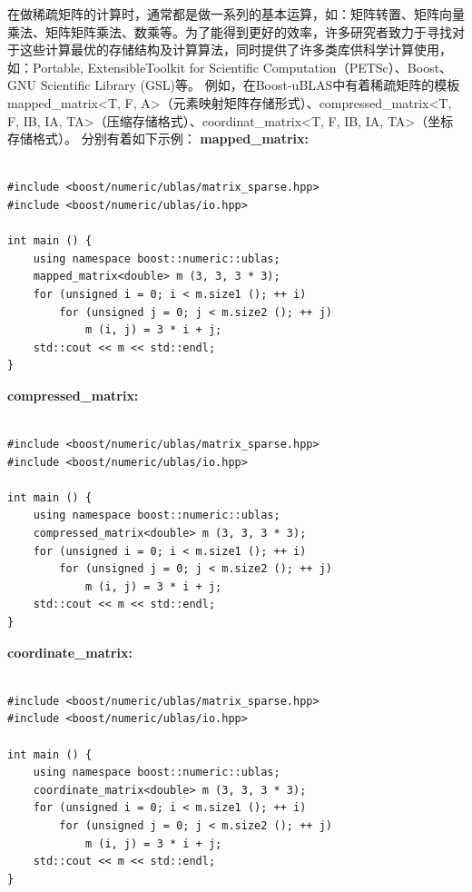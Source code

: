 在做稀疏矩阵的计算时，通常都是做一系列的基本运算，如：矩阵转置、矩阵向量乘法、矩阵矩阵乘法、数乘等。为了能得到更好的效率，许多研究者致力于寻找对于这些计算最优的存储结构及计算算法，同时提供了许多类库供科学计算使用，如：Portable, ExtensibleToolkit for Scientific Computation（PETSc）、Boost、GNU Scientific Library (GSL)等。\newline
例如，在Boost-uBLAS中有着稀疏矩阵的模板mapped\_matrix<T, F, A>（元素映射矩阵存储形式）、compressed\_matrix<T, F, IB, IA, TA>（压缩存储格式）、coordinat\_matrix<T, F, IB, IA, TA>（坐标存储格式）。
分别有着如下示例：\cite{boost_ublas}\newline
\textbf{mapped\_matrix:}
\begin{lstlisting}

#include <boost/numeric/ublas/matrix_sparse.hpp>
#include <boost/numeric/ublas/io.hpp>

int main () {
    using namespace boost::numeric::ublas;
    mapped_matrix<double> m (3, 3, 3 * 3);
    for (unsigned i = 0; i < m.size1 (); ++ i)
        for (unsigned j = 0; j < m.size2 (); ++ j)
            m (i, j) = 3 * i + j;
    std::cout << m << std::endl;
}

\end{lstlisting}

\textbf{compressed\_matrix:}
\begin{lstlisting}

#include <boost/numeric/ublas/matrix_sparse.hpp>
#include <boost/numeric/ublas/io.hpp>

int main () {
    using namespace boost::numeric::ublas;
    compressed_matrix<double> m (3, 3, 3 * 3);
    for (unsigned i = 0; i < m.size1 (); ++ i)
        for (unsigned j = 0; j < m.size2 (); ++ j)
            m (i, j) = 3 * i + j;
    std::cout << m << std::endl;
}

\end{lstlisting}

\textbf{coordinate\_matrix:}
\begin{lstlisting}

#include <boost/numeric/ublas/matrix_sparse.hpp>
#include <boost/numeric/ublas/io.hpp>

int main () {
    using namespace boost::numeric::ublas;
    coordinate_matrix<double> m (3, 3, 3 * 3);
    for (unsigned i = 0; i < m.size1 (); ++ i)
        for (unsigned j = 0; j < m.size2 (); ++ j)
            m (i, j) = 3 * i + j;
    std::cout << m << std::endl;
}
\end{lstlisting}

